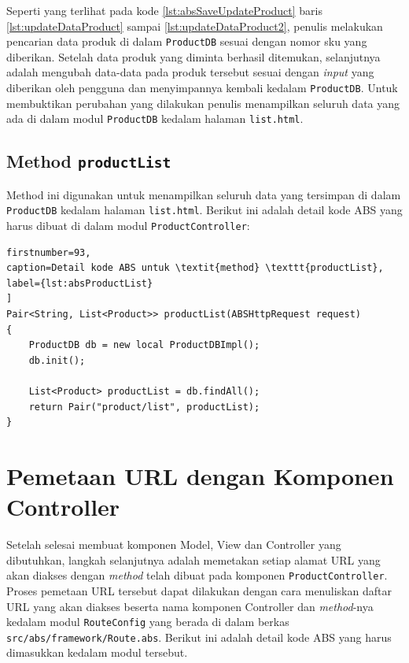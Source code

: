 Seperti yang terlihat pada kode \ref{lst:absSaveUpdateProduct} baris \ref{lst:updateDataProduct} sampai \ref{lst:updateDataProduct2}, penulis melakukan pencarian data produk di dalam \texttt{ProductDB} sesuai dengan nomor sku yang diberikan. Setelah data produk yang diminta berhasil ditemukan, selanjutnya adalah mengubah data-data pada produk tersebut sesuai dengan \textit{input} yang diberikan oleh pengguna dan menyimpannya kembali kedalam \texttt{ProductDB}. Untuk membuktikan perubahan yang dilakukan penulis menampilkan seluruh data yang ada di dalam modul \texttt{ProductDB} kedalam halaman \texttt{list.html}.

\subsection{Method \texttt{productList}}
Method ini digunakan untuk menampilkan seluruh data yang tersimpan di dalam \texttt{ProductDB} kedalam halaman \texttt{list.html}. Berikut ini adalah detail kode ABS yang harus dibuat di dalam modul \texttt{ProductController}:

\begin{lstlisting}
firstnumber=93,
caption=Detail kode ABS untuk \textit{method} \texttt{productList},
label={lst:absProductList}
]
Pair<String, List<Product>> productList(ABSHttpRequest request)
{
	ProductDB db = new local ProductDBImpl();
	db.init();
	
	List<Product> productList = db.findAll();
	return Pair("product/list", productList);
}
\end{lstlisting}

\section{Pemetaan URL dengan Komponen Controller}

Setelah selesai membuat komponen Model, View dan Controller yang dibutuhkan, langkah selanjutnya adalah memetakan setiap alamat URL yang akan diakses dengan \textit{method} telah dibuat pada komponen \texttt{ProductController}. Proses pemetaan URL tersebut dapat dilakukan dengan cara menuliskan daftar URL yang akan diakses beserta nama komponen Controller dan \textit{method}-nya kedalam modul \texttt{RouteConfig} yang berada di dalam berkas \texttt{src/abs/framework/Route.abs}. Berikut ini adalah detail kode ABS yang harus dimasukkan kedalam modul tersebut.

